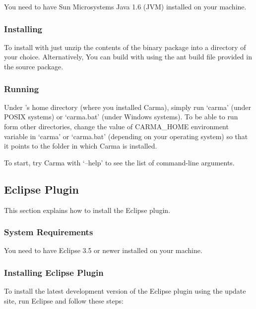 \documentclass{article}
\begin{document}
You need to have Sun Microsystems Java 1.6 (JVM) installed on your machine.

\subsubsection{Installing \Carma}

To install \CoreASM with \Carma just unzip the contents of the binary package into a 
directory of your choice. Alternatively, You can build \CoreASM with \Carma using the 
ant build file provided in the source package.

\subsubsection{Running \Carma}

Under \Carma's home directory (where you installed Carma), 
simply run `carma' (under POSIX systems) or `carma.bat' (under Windows systems). 
To be able to run \Carma form other directories, change the value of {\ttfamily CARMA\_HOME} environment 
variable in `carma' or `carma.bat' (depending on your operating system) so that it points to the folder 
in which Carma is installed.

To start, try Carma with `{\ttfamily --help}' to see the list of command-line arguments. 

\subsection{\CoreASM Eclipse Plugin}

This section explains how to install the \CoreASM Eclipse plugin.

\subsubsection{System Requirements}

You need to have Eclipse 3.5 or newer installed on your machine.

\subsubsection{Installing \CoreASM Eclipse Plugin}

To install the latest development version of the \CoreASM Eclipse plugin using the update site, 
run Eclipse and follow these steps:

\newcommand{\menulink}{$\rightarrow$}
\newcommand{\menunav}[1]{{\sl #1}}
\end{document}
